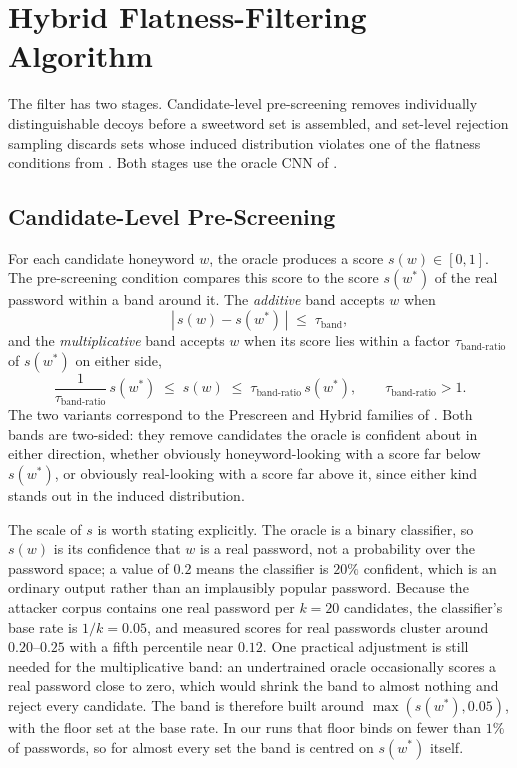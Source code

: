 \section{Hybrid Flatness-Filtering Algorithm}
\label{sec:method-filter}

The filter has two stages. Candidate-level pre-screening removes
individually distinguishable decoys before a sweetword set is assembled,
and set-level rejection sampling discards sets whose induced
distribution violates one of the flatness conditions from
. Both stages use the oracle CNN of
.

\subsection{Candidate-Level Pre-Screening}

For each candidate honeyword $w$, the oracle produces a score
$s(w) \in [0, 1]$. The pre-screening condition compares this score to
the score $s(w^{*})$ of the real password within a band around it. The
\emph{additive} band accepts $w$ when
%
\begin{equation}
|\, s(w) - s(w^{*}) \,| \;\le\; \tau_{\text{band}},
\end{equation}
%
and the \emph{multiplicative} band accepts $w$ when its score lies
within a factor $\tau_{\text{band-ratio}}$ of $s(w^{*})$ on either side,
%
\begin{equation}
\frac{1}{\tau_{\text{band-ratio}}}\, s(w^{*}) \;\le\; s(w) \;\le\;
\tau_{\text{band-ratio}}\, s(w^{*}),
\qquad \tau_{\text{band-ratio}} > 1.
\end{equation}
%
The two variants correspond to the Prescreen and Hybrid families of
. Both bands are two-sided: they remove candidates
the oracle is confident about in either direction, whether obviously
honeyword-looking with a score far below $s(w^{*})$, or obviously
real-looking with a score far above it, since either kind stands out in
the induced distribution.

The scale of $s$ is worth stating explicitly. The oracle is a binary
classifier, so $s(w)$ is its confidence that $w$ is a real password, not
a probability over the password space; a value of $0.2$ means the
classifier is $20\%$ confident, which is an ordinary output rather than
an implausibly popular password. Because the attacker corpus contains
one real password per $k = 20$ candidates, the classifier's base rate is
$1/k = 0.05$, and measured scores for real passwords cluster around
$0.20$--$0.25$ with a fifth percentile near $0.12$. One practical
adjustment is still needed for the multiplicative band: an undertrained
oracle occasionally scores a real password close to zero, which would
shrink the band to almost nothing and reject every candidate. The band
is therefore built around $\max(s(w^{*}), 0.05)$, with the floor set at
the base rate. In our runs that floor binds on fewer than $1\%$ of
passwords, so for almost every set the band is centred on $s(w^{*})$
itself.

